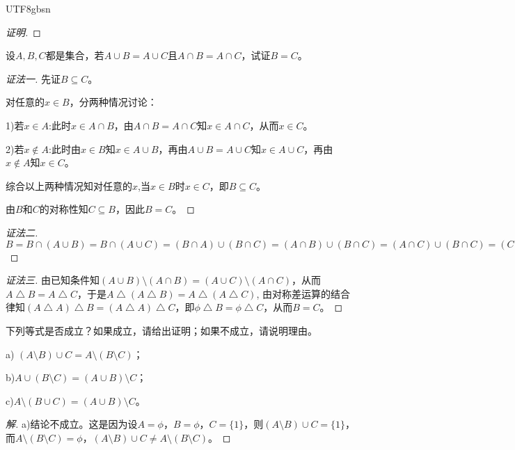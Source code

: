 \documentclass{article}
\begin{document}
\begin{CJK}{UTF8}{gbsn}
\begin{proof}[证明]
\end{proof}
\begin{Exercise}
  设$A,B,C$都是集合，若$A\cup B = A\cup C$且$A\cap B = A\cap C$，试证$B=C$。
\end{Exercise}
\begin{proof}[证法一]
  先证$B\subseteq C$。

  对任意的$x \in B$，分两种情况讨论：

  1)若$x \in A$:此时$x \in A\cap B$，由$A\cap B = A\cap C$知$x \in A\cap C$，从而$x \in C$。

  2)若$x \notin A$:此时由$x\in B$知$x\in A\cup B$，再由$A\cup B = A\cup C$知$x \in A\cup C$，再由$x \notin A$知$x \in C$。

  综合以上两种情况知对任意的$x$,当$x\in B$时$x\in C$，即$B \subseteq C$。
  

  由$B$和$C$的对称性知$C \subseteq B$，因此$B=C$。
\end{proof}

\begin{proof}[证法二]
  $B= B\cap (A\cup B) = B \cap (A \cup C) = (B \cap A) \cup (B \cap C) = (A \cap B) \cup (B \cap C) = (A \cap C) \cup (B \cap C) = (C \cap A) \cup (C \cap B) = C \cap (A \cup B) = C \cap (A \cup C) = C$
  
\end{proof}

\begin{proof}[证法三]
由已知条件知$(A\cup B)\setminus (A\cap B) = (A\cup C)\setminus (A\cap C)$，从而$A\bigtriangleup B = A \bigtriangleup C$，于是$A \bigtriangleup (A\bigtriangleup B) =A \bigtriangleup (A \bigtriangleup C)$, 由对称差运算的结合律知$(A \bigtriangleup A)\bigtriangleup B =(A \bigtriangleup A) \bigtriangleup C$，即$\phi \bigtriangleup B = \phi \bigtriangleup C$，从而$B = C$。
\end{proof}

\begin{Exercise}
  下列等式是否成立？如果成立，请给出证明；如果不成立，请说明理由。

  a) $(A\setminus B)\cup C = A\setminus (B\setminus C)$；

  b)$A\cup(B\setminus C) = (A\cup B)\setminus C$；

  c)$A\setminus (B\cup C) = (A\cup B)\setminus C$。
\end{Exercise}
\begin{proof}[解]
  a)结论不成立。这是因为设$A=\phi$，$B=\phi$，$C=\{1\}$，则$(A\setminus B)\cup C=\{1\}$，而$A\setminus (B\setminus C)=\phi$，$(A\setminus B)\cup C \neq A\setminus (B\setminus C)$。


\end{proof}
\end{CJK}
\end{document}
